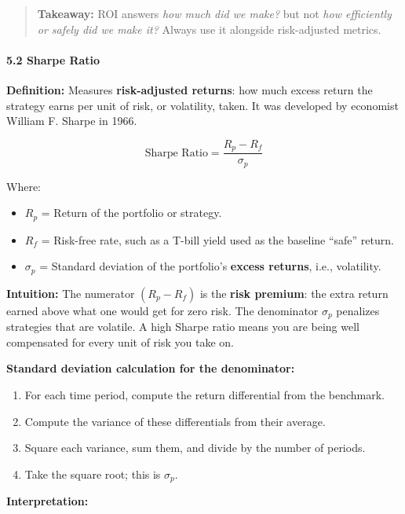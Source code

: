 \documentclass[12pt,openany]{book}
\begin{document}
\begin{quote}
    \textbf{Takeaway:} ROI answers \emph{how much did we make?} but not \emph{how efficiently or safely did we make it?} Always use it alongside risk-adjusted metrics.
\end{quote}

\paragraph{5.2 Sharpe Ratio}

\textbf{Definition:} Measures \textbf{risk-adjusted returns}: how much excess return the strategy earns per unit of risk, or volatility, taken. It was developed by economist William F. Sharpe in 1966.

\begin{equation*}
    \text{Sharpe Ratio} = \frac{R_p - R_f}{\sigma_p}
\end{equation*}

Where:
\begin{itemize}[leftmargin=*]
    \item $R_p$ = Return of the portfolio or strategy.
    \item $R_f$ = Risk-free rate, such as a T-bill yield used as the baseline ``safe'' return.
    \item $\sigma_p$ = Standard deviation of the portfolio's \textbf{excess returns}, i.e., volatility.
\end{itemize}

\textbf{Intuition:} The numerator $(R_p - R_f)$ is the \textbf{risk premium}: the extra return earned above what one would get for zero risk. The denominator $\sigma_p$ penalizes strategies that are volatile. A high Sharpe ratio means you are being well compensated for every unit of risk you take on.

\textbf{Standard deviation calculation for the denominator:}
\begin{enumerate}[leftmargin=*]
    \item For each time period, compute the return differential from the benchmark.
    \item Compute the variance of these differentials from their average.
    \item Square each variance, sum them, and divide by the number of periods.
    \item Take the square root; this is $\sigma_p$.
\end{enumerate}

\textbf{Interpretation:}
\end{document}
